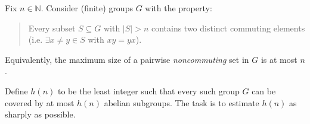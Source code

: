 Fix $n\in\mathbb N$.  Consider (finite) groups $G$ with the property:

\begin{quote}
Every subset $S\subseteq G$ with $|S|>n$ contains two distinct commuting elements (i.e. $\exists x\neq y\in S$ with $xy=yx$).
\end{quote}

Equivalently, the maximum size of a pairwise \emph{noncommuting} set in $G$ is at most $n$.

Define $h(n)$ to be the least integer such that every such group $G$ can be covered by at most $h(n)$ abelian subgroups.
The task is to estimate $h(n)$ as sharply as possible.

